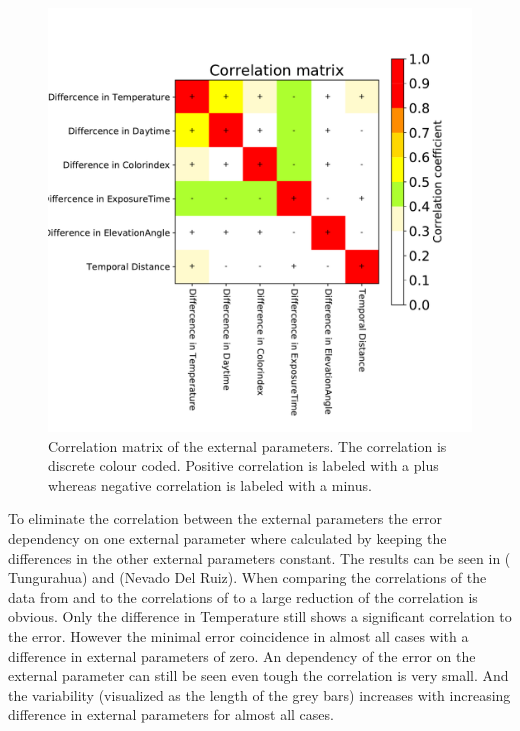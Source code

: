 \documentclass  [
  paper    = a4,
  BCOR     = 10mm,
  twoside,
  fontsize = 12pt,
  fleqn,
  toc      = bibnumbered,
  toc      = listofnumbered,
  numbers  = noendperiod,
  headings = normal,
  listof   = leveldown,
  version  = 3.03
]                                       {scrreprt}
\begin{document}
	\begin{figure}
		\centering
		\includegraphics[width=1\linewidth]{Bilder/varCorrelation_matrix}
		\caption{Correlation matrix of the external parameters. The correlation is discrete colour coded. Positive correlation is labeled with a plus whereas negative correlation is labeled with a minus.}
		\label{fig:varcorrelationmatrix}
	\end{figure}
%
	To eliminate the correlation between the external parameters the   error dependency on one external parameter where calculated by keeping the differences in the other external parameters constant. The results can be seen in  ( Tungurahua) and  (Nevado Del Ruiz). When comparing the correlations of the data from  and   to the correlations of 
	 to  a large reduction of the correlation is obvious. Only the difference in Temperature still shows a significant correlation to the   error. However the minimal   error coincidence in almost all cases with a difference in external parameters of zero. An dependency of the   error on the external parameter can still be seen even tough the correlation is very small. And the variability (visualized as the length of the grey bars) increases with increasing difference in external parameters for almost all cases.\\	
\end{document}
